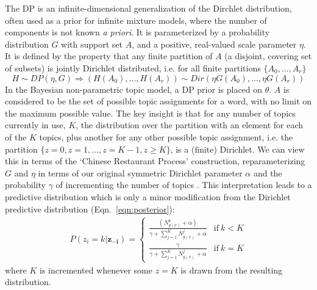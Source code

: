 The DP is an infinite-dimensional generalization of the Dirchlet distribution, often used as a prior for infinite mixture models, where the number of components is not known \emph{a priori}. It is parameterized by a probability distribution $G$ with support set $A$, and a positive, real-valued scale parameter $\eta$. It is defined by the property that any finite partition of $A$ (a disjoint, covering set of subsets) is jointly Dirichlet distributed, i.e. for all finite partitions $\{A_0, \ldots, A_r\}$ \citep{Teh2010}
\begin{equation}
H \sim DP(\eta, G) \Rightarrow (H(A_0), \ldots, H(A_r)) \sim Dir(\eta G(A_0),\ldots,\eta G(A_r))
\end{equation}
In the Bayesian non-parametric topic model, a DP prior is placed on $\theta$. $A$ is considered to be the set of possible topic assignments for a word, with no limit on the maximum possible value. The key insight is that for any number of topics currently in use, $K$, the distribution over the partition with an element for each of the $K$ topics, plus another for any other possible topic assignment, i.e. the partition $\{z = 0, z = 1, \ldots, z = K - 1, z \geq K\}$, is a (finite) Dirichlet. We can view this in terms of the `Chinese Restaurant Process' construction, reparameterizing $G$ and $\eta$ in terms of our original symmetric Dirichlet parameter $\alpha$ and the probability $\gamma$ of incrementing the number of topics \citep{jordan2005}. This interpretation leads to a predictive distribution which is only a minor modification from the Dirichlet predictive distribution (Eqn.~\ref{eqn:posterior}):
\begin{equation}
\begin{aligned}
P(z_i = k | \boldsymbol{z_{-i}}) =
\begin{cases}
\frac{(N^k_{g(x)} + \alpha)}{\gamma + \sum_{j=1}^K N^j_{g(x)} + \alpha} & \mathrm{if}~k < K\\
\frac{\gamma}{\gamma + \sum_{j=1}^K N^j_{g(x)} + \alpha} & \mathrm{if}~k = K
\end{cases}
\end{aligned}
\end{equation}
where $K$ is incremented whenever some $z=K$ is drawn from the resulting distribution.

